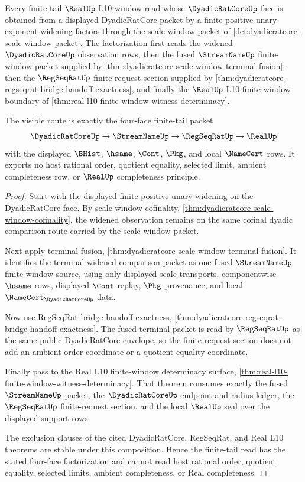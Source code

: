 \begin{theorem}
\label{thm:dyadicratcore-finite-tail-window-factorization}
Every finite-tail $\RealUp$ L10 window read whose $\DyadicRatCoreUp$ face is obtained from a displayed DyadicRatCore packet by a finite positive-unary exponent widening factors through the scale-window packet of \autoref{def:dyadicratcore-scale-window-packet}. The factorization first reads the widened $\DyadicRatCoreUp$ observation rows, then the fused $\StreamNameUp$ finite-window packet supplied by \autoref{thm:dyadicratcore-scale-window-terminal-fusion}, then the $\RegSeqRatUp$ finite-request section supplied by \autoref{thm:dyadicratcore-regseqrat-bridge-handoff-exactness}, and finally the $\RealUp$ L10 finite-window boundary of \autoref{thm:real-l10-finite-window-witness-determinacy}.

The visible route is exactly the four-face finite-tail packet
$$
\DyadicRatCoreUp \to \StreamNameUp \to \RegSeqRatUp \to \RealUp
$$
with the displayed $\BHist$, $\hsame$, $\Cont$, $\Pkg$, and local $\NameCert$ rows. It exports no host rational order, quotient equality, selected limit, ambient completeness row, or $\RealUp$ completeness principle.
\end{theorem}
\begin{proof}
Start with the displayed finite positive-unary widening on the DyadicRatCore face. By scale-window cofinality, \autoref{thm:dyadicratcore-scale-window-cofinality}, the widened observation remains on the same cofinal dyadic comparison route carried by the scale-window packet.

Next apply terminal fusion, \autoref{thm:dyadicratcore-scale-window-terminal-fusion}. It identifies the terminal widened comparison packet as one fused $\StreamNameUp$ finite-window source, using only displayed scale transports, componentwise $\hsame$ rows, displayed $\Cont$ replay, $\Pkg$ provenance, and local $\NameCert_{\DyadicRatCoreUp}$ data.

Now use RegSeqRat bridge handoff exactness, \autoref{thm:dyadicratcore-regseqrat-bridge-handoff-exactness}. The fused terminal packet is read by $\RegSeqRatUp$ as the same public DyadicRatCore envelope, so the finite request section does not add an ambient order coordinate or a quotient-equality coordinate.

Finally pass to the Real L10 finite-window determinacy surface, \autoref{thm:real-l10-finite-window-witness-determinacy}. That theorem consumes exactly the fused $\StreamNameUp$ packet, the $\DyadicRatCoreUp$ endpoint and radius ledger, the $\RegSeqRatUp$ finite-request section, and the local $\RealUp$ seal over the displayed support rows.

The exclusion clauses of the cited DyadicRatCore, RegSeqRat, and Real L10 theorems are stable under this composition. Hence the finite-tail read has the stated four-face factorization and cannot read host rational order, quotient equality, selected limits, ambient completeness, or Real completeness.
\end{proof}

